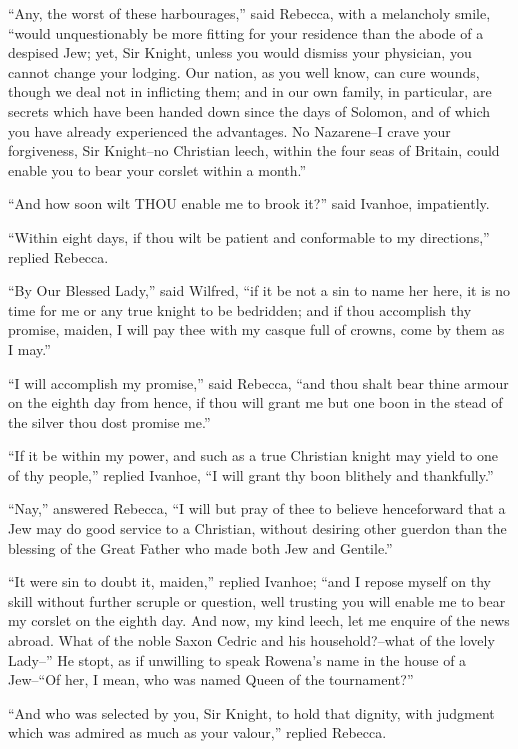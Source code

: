 ``Any, the worst of these harbourages,'' said Rebecca, with a melancholy
smile, ``would unquestionably be more fitting for your residence than
the abode of a despised Jew; yet, Sir Knight, unless you would dismiss
your physician, you cannot change your lodging. Our nation, as you well
know, can cure wounds, though we deal not in inflicting them; and in our
own family, in particular, are secrets which have been handed down since
the days of Solomon, and of which you have already experienced the
advantages. No Nazarene--I crave your forgiveness, Sir Knight--no
Christian leech, within the four seas of Britain, could enable you to
bear your corslet within a month.''

``And how soon wilt THOU enable me to brook it?'' said Ivanhoe,
impatiently.

``Within eight days, if thou wilt be patient and conformable to my
directions,'' replied Rebecca.

``By Our Blessed Lady,'' said Wilfred, ``if it be not a sin to name her
here, it is no time for me or any true knight to be bedridden; and if
thou accomplish thy promise, maiden, I will pay thee with my casque full
of crowns, come by them as I may.''

``I will accomplish my promise,'' said Rebecca, ``and thou shalt bear
thine armour on the eighth day from hence, if thou will grant me but one
boon in the stead of the silver thou dost promise me.''

``If it be within my power, and such as a true Christian knight may
yield to one of thy people,'' replied Ivanhoe, ``I will grant thy boon
blithely and thankfully.''

``Nay,'' answered Rebecca, ``I will but pray of thee to believe
henceforward that a Jew may do good service to a Christian, without
desiring other guerdon than the blessing of the Great Father who made
both Jew and Gentile.''

``It were sin to doubt it, maiden,'' replied Ivanhoe; ``and I repose
myself on thy skill without further scruple or question, well trusting
you will enable me to bear my corslet on the eighth day. And now, my
kind leech, let me enquire of the news abroad. What of the noble Saxon
Cedric and his household?--what of the lovely Lady--'' He stopt, as if
unwilling to speak Rowena's name in the house of a Jew--``Of her, I
mean, who was named Queen of the tournament?''

``And who was selected by you, Sir Knight, to hold that dignity, with
judgment which was admired as much as your valour,'' replied Rebecca.

